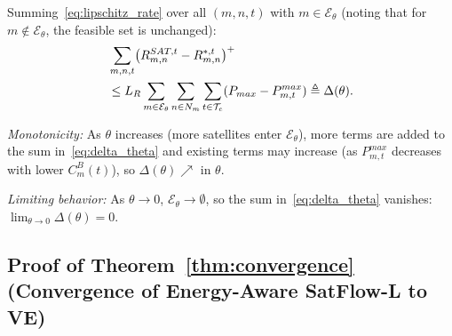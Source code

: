 \documentclass[journal]{IEEEtran}
\newcommand{\CB}{C^{B}}
\newcommand{\Pmax}{P_{max}}
\newcommand{\calT}{\mathcal{T}}
\begin{document}
\begin{IEEEproof}
Summing~\eqref{eq:lipschitz_rate} over all $(m,n,t)$ with $m \in \mathcal{E}_\theta$ (noting that for $m \notin \mathcal{E}_\theta$, the feasible set is unchanged):
\begin{align}
    &\sum_{m,n,t}
    \bigl(R_{m,n}^{SAT,t} - R_{m,n}^{*,t}\bigr)^+
    \notag\\
    &\leq L_R
    \sum_{m \in \mathcal{E}_\theta}
    \sum_{n \in N_m} \sum_{t \in \calT_e}
    (\Pmax - P_{m,t}^{max})
    \triangleq \Delta(\theta).
    \label{eq:delta_theta}
\end{align}

\noindent\emph{Monotonicity:}
As $\theta$ increases (more satellites enter $\mathcal{E}_\theta$), more terms are added to the sum in~\eqref{eq:delta_theta} and existing terms may increase (as $P_{m,t}^{max}$ decreases with lower $\CB_m(t)$), so $\Delta(\theta) \nearrow$ in $\theta$.

\noindent\emph{Limiting behavior:}
As $\theta \to 0$, $\mathcal{E}_\theta \to
\emptyset$, so the sum in~\eqref{eq:delta_theta}
vanishes: $\lim_{\theta \to 0} \Delta(\theta) = 0$.

\end{IEEEproof}

\subsection{Proof of Theorem~\ref{thm:convergence}
(Convergence of Energy-Aware SatFlow-L to VE)}
\end{document}
